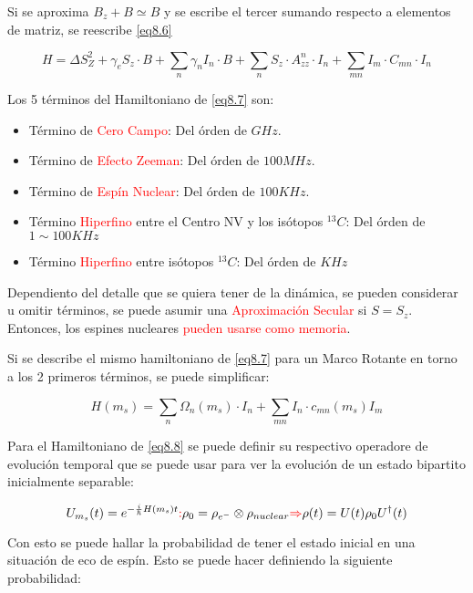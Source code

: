 \documentclass{book}
\begin{document}
Si se aproxima $B_z+B\simeq B$ y se escribe el tercer sumando respecto a elementos de matriz, se reescribe \ref{eq8.6}

\begin{equation}\label{eq8.7}H=\Delta S_Z^2+\gamma_e S_z\cdot B+\sum_n \gamma_n I_n\cdot B+\sum_n S_z\cdot A_{zz}^n\cdot I_n+\sum_{mn}I_m\cdot C_{mn}\cdot I_n\end{equation}

Los 5 términos del Hamiltoniano de \ref{eq8.7} son:

\begin{itemize}
    \item Término de \textcolor{red}{Cero Campo}: Del órden de $GHz$.
    \item Término de \textcolor{red}{Efecto Zeeman}: Del órden de $100MHz$.
    \item Término de \textcolor{red}{Espín Nuclear}: Del órden de $100KHz$.
    \item Término \textcolor{red}{Hiperfino} entre el Centro NV y los isótopos ${}^{13}C$: Del órden de $1\sim 100KHz$
    \item Término \textcolor{red}{Hiperfino} entre isótopos ${}^{13}C$: Del órden de $KHz$
\end{itemize}

Dependiento del detalle que se quiera tener de la dinámica, se pueden considerar u omitir términos, se puede asumir una \textcolor{red}{Aproximación Secular} si $S=S_z$. Entonces, los espines nucleares \textcolor{red}{pueden usarse como memoria}.

Si se describe el mismo hamiltoniano de \ref{eq8.7} para un Marco Rotante en torno a los 2 primeros términos, se puede simplificar:

\begin{equation}\label{eq8.8}H(m_s)=\sum_n \Omega_n(m_s)\cdot I_n +\sum_{mn} I_n\cdot c_{mn}(m_s)I_m\end{equation}

Para el Hamiltoniano de \ref{eq8.8} se puede definir su respectivo operadore de evolución temporal que se puede usar para ver la evolución de un estado bipartito inicialmente separable:

\begin{equation}\label{eq8.9}U_{m_s}(t)=e^{-\frac{i}{\hslash}H(m_s)t}\textcolor{red}{:}\rho_0=\rho_{e^{-}}\otimes \rho_{nuclear}\textcolor{red}{\Rightarrow} \rho(t)=U(t)\rho_0U^\dag(t)\end{equation}

Con esto se puede hallar la probabilidad de tener el estado inicial en una situación de eco de espín. Esto se puede hacer definiendo la siguiente probabilidad:
\end{document}
